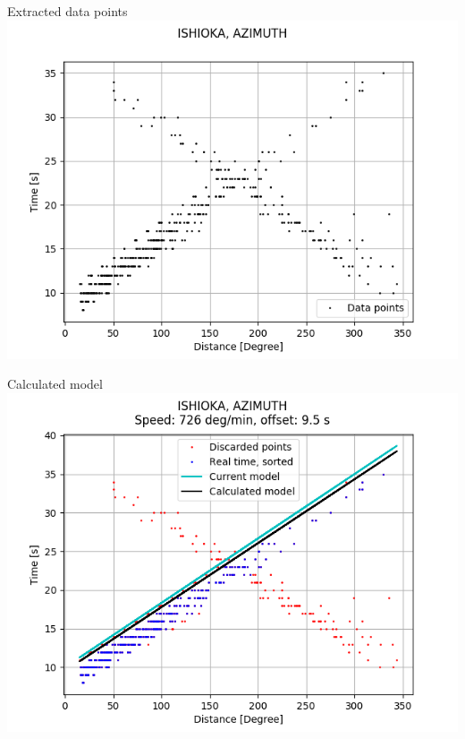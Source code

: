 \documentclass{beamer}
\begin{document}
    \begin{frame}{Extracted data points}
        \centering
        \includegraphics[width=1\columnwidth]{ISHIOKA_AZIMUT_DATA}
    \end{frame}
    \begin{frame}{Calculated model}
        \centering
        \includegraphics[width=1\columnwidth]{ISHIOKA_AZIMUT}
    \end{frame}
\end{document}
